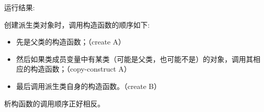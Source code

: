 \documentclass[letterpaper,10pt,english]{sphinxmanual}
\begin{document}
运行结果:

%
\begin{sphinxVerbatim}[commandchars=\\\{\}]
 
 
 
 
\end{sphinxVerbatim}

创建派生类对象时，调用构造函数的顺序如下:
\begin{itemize}
\item {} 
先是父类的构造函数；（create A）

\item {} 
然后如果类成员变量中有某类（可能是父类，也可能不是）的对象，调用其相应的构造函数；（copy-construct A）

\item {} 
最后调用派生类自身的构造函数。（create B）

\end{itemize}

析构函数的调用顺序正好相反。
\end{document}
